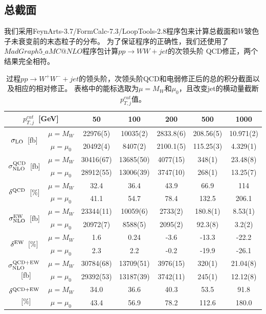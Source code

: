 \subsection{总截面}
我们采用FeynArts-3.7/FormCalc-7.3/LoopTools-2.8程序包来计算总截面和$W$玻色子未衰变前的末态粒子的分布。
为了保证程序的正确性，我们还使用了$MadGraph5\_aMC@NLO$\cite{mg5}程序包计算$pp\to WW+jet$的次领头阶
QCD修正，两个结果完全相符。

\begin{table}
\center
\begin{tabular}{|c|c|ccccc|}
\hline
\multicolumn{2}{|c|}{$p^{cut}_{T,j}$~[GeV]}   & 50 &  100  &  200 & 500 & 1000   \\
\hline
\multirow{2}{*}{$\sigma_{{\rm LO}}$~[fb]}  & $\mu = M_W$ & 22976(5) & 10035(2)  & 2833.8(6) & 208.56(5) & 10.971(2) \\
&  $\mu = \mu_0$ & 20492(4) &  8407(2)  &  2100.1(5) & 115.25(3) & 4.329(1)   \\
\hline
\multirow{2}{*}{$\sigma^{{\rm QCD}}_{{\rm NLO}}$~[fb]} & $\mu = M_W$ & 30416(67) & 13685(50)  & 4077(15) & 348(1) & 23.48(8) \\
& $\mu = \mu_0$ & 28912(55)  &  13006(39)  &  3747(10) & 268(1) & 13.25(7) \\
\hline
\multirow{2}{*}{$\delta^{{\rm QCD}}$~[\%]} & $\mu = M_W$ & 32.4 & 36.4  & 43.9 & 66.9 & 114 \\
& $\mu = \mu_0$ & 41.1  & 54.7 &  78.4 &  132.5 & 206.1 \\
\hline
\multirow{2}{*}{$\sigma^{{\rm EW}}_{{\rm NLO}}$~[fb]} & $\mu = M_W$ & 23344(11) & 10059(6)  & 2733(2) & 180.8(1) & 8.53(1) \\
& $\mu = \mu_0$ & 20972(7) &  8588(5)  & 2095(2) & 92.3(8) & 3.2(2)  \\
\hline
\multirow{2}{*}{$\delta^{{\rm EW}}$~[\%]} & $\mu = M_W$ & 1.6 & 0.24  & -3.6 & -13.3 & -22.2 \\
& $\mu = \mu_0$ &  2.3  &  2.2  & -0.2  & -19.9 & -26.1 \\
\hline
\multirow{2}{*}{$\sigma^{{\rm QCD + EW}}_{{\rm NLO}}$~[fb]} & $\mu = M_W$ & 30784(68) & 13709(51) & 3976(15) & 320(1) & 21.04(8) \\
& $\mu = \mu_0$ & 29392(53) & 13187(39) & 3742(11) & 245(1) & 12.12(8) \\
\hline
\multirow{2}{*}{$\delta^{{\rm QCD + EW}}$~[\%]} & $\mu = M_W$ & 34.0 & 36.6  & 40.3 & 53.5 & 91.8 \\
& $\mu = \mu_0$ & 43.4 & 56.9 & 78.2 & 112.6 & 180.0 \\
\hline
\end{tabular}
\caption{过程$pp\to W^+W^-+jet$的领头阶，次领头阶QCD和电弱修正后的总的积分截面以及相应的相对修正。
表格中的能标选取为$\mu = M_W$和$\mu_0$，且改变jet的横动量截断$p^{cut}_{T,j}$值。}
\label{tab:ptcut}
\end{table}

